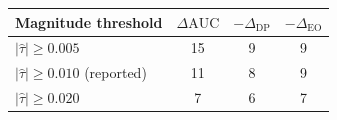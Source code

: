 \scriptsize
\setlength{\tabcolsep}{6pt}
\renewcommand{\arraystretch}{1.1}
\begin{tabular}{@{}lccc@{}}
\toprule
Magnitude threshold &
\(\Delta\mathrm{AUC}\) &
\(-\Delta_{\mathrm{DP}}\) &
\(-\Delta_{\mathrm{EO}}\) \\
\midrule
\(|\hat\tau| \geq 0.005\) & 15 & 9 & 9 \\
\(|\hat\tau| \geq 0.010\) (reported) & 11 & 8 & 9 \\
\(|\hat\tau| \geq 0.020\) & 7 & 6 & 7 \\
\bottomrule
\end{tabular}
